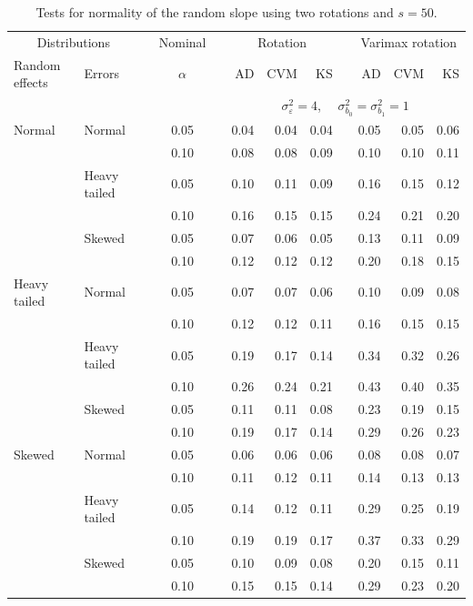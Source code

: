 \documentclass[12pt]{article} %
\begin{document}
\begin{table}[ht]
\caption{Tests for normality of the random slope using two rotations and $s = 50$.}
\begin{scriptsize}
\begin{center}
\begin{tabular}{ll p{.1cm} c p{.1cm} rrr p{.1cm} rrr}
  \hline
  \multicolumn{2}{c}{Distributions}& & Nominal & &  \multicolumn{3}{c}{Rotation} & & \multicolumn{3}{c}{Varimax rotation} \\ \cline{1-2} \cline{6-8} \cline{10-12}   
  Random effects & Errors & & $\alpha$ & & AD & CVM & KS & & AD & CVM & KS \\ 
   \hline
& && && \multicolumn{7}{c}{$\sigma_{\varepsilon}^2 = 4$, \ \ $\sigma_{b_0}^2 = \sigma_{b_1}^2 = 1$} \\ \cline{6-12}
Normal       & Normal       && 0.05 &&  0.04 & 0.04 & 0.04 && 0.05 & 0.05 & 0.06 \\ 
             &              && 0.10 &&  0.08 & 0.08 & 0.09 && 0.10 & 0.10 & 0.11 \\ 
             & Heavy tailed && 0.05 &&  0.10 & 0.11 & 0.09 && 0.16 & 0.15 & 0.12 \\ 
             &              && 0.10 &&  0.16 & 0.15 & 0.15 && 0.24 & 0.21 & 0.20 \\ 
             & Skewed       && 0.05 &&  0.07 & 0.06 & 0.05 && 0.13 & 0.11 & 0.09 \\ 
             &              && 0.10 &&  0.12 & 0.12 & 0.12 && 0.20 & 0.18 & 0.15 \\ 
Heavy tailed & Normal       && 0.05 &&  0.07 & 0.07 & 0.06 && 0.10 & 0.09 & 0.08 \\ 
             &              && 0.10 &&  0.12 & 0.12 & 0.11 && 0.16 & 0.15 & 0.15 \\ 
             & Heavy tailed && 0.05 &&  0.19 & 0.17 & 0.14 && 0.34 & 0.32 & 0.26 \\ 
             &              && 0.10 &&  0.26 & 0.24 & 0.21 && 0.43 & 0.40 & 0.35 \\ 
             & Skewed       && 0.05 &&  0.11 & 0.11 & 0.08 && 0.23 & 0.19 & 0.15 \\ 
             &              && 0.10 &&  0.19 & 0.17 & 0.14 && 0.29 & 0.26 & 0.23 \\ 
Skewed       & Normal       && 0.05 &&  0.06 & 0.06 & 0.06 && 0.08 & 0.08 & 0.07 \\ 
             &              && 0.10 &&  0.11 & 0.12 & 0.11 && 0.14 & 0.13 & 0.13 \\ 
             & Heavy tailed && 0.05 &&  0.14 & 0.12 & 0.11 && 0.29 & 0.25 & 0.19 \\ 
             &              && 0.10 &&  0.19 & 0.19 & 0.17 && 0.37 & 0.33 & 0.29 \\ 
             & Skewed       && 0.05 &&  0.10 & 0.09 & 0.08 && 0.20 & 0.15 & 0.11 \\ 
             &              && 0.10 &&  0.15 & 0.15 & 0.14 && 0.29 & 0.23 & 0.20 \\ 


\end{tabular}
\end{center}
\end{scriptsize}
\end{table}
\end{document}
